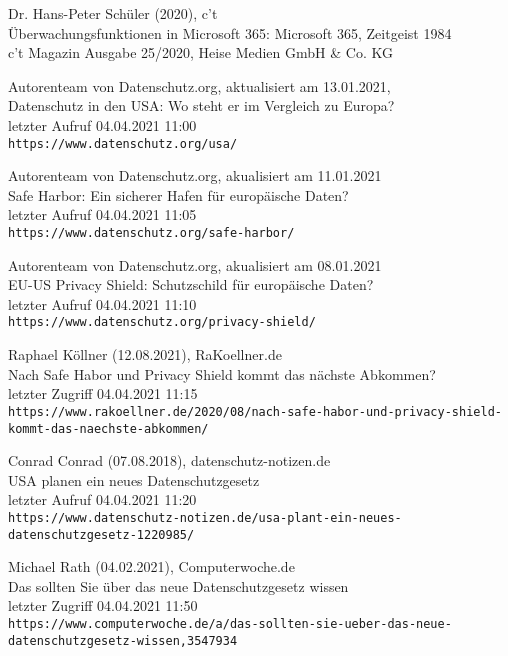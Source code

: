 \begin{thebibliography}{9}
    \bibitem{}
        Dr. Hans-Peter Schüler (2020), c't
        \\Überwachungsfunktionen in Microsoft 365: Microsoft 365, Zeitgeist 1984
        \\c't Magazin Ausgabe 25/2020, Heise Medien GmbH \& Co. KG

    \bibitem{}
        Autorenteam von Datenschutz.org, aktualisiert am 13.01.2021,
        \\Datenschutz in den USA: Wo steht er im Vergleich zu Europa?
        \\letzter Aufruf 04.04.2021 11:00
        \\\texttt{https://www.datenschutz.org/usa/}

    \bibitem{}
        Autorenteam von Datenschutz.org, akualisiert am 11.01.2021
        \\Safe Harbor: Ein sicherer Hafen für europäische Daten?
        \\letzter Aufruf 04.04.2021 11:05
        \\\texttt{https://www.datenschutz.org/safe-harbor/}

    \bibitem{}
        Autorenteam von Datenschutz.org, akualisiert am 08.01.2021
        \\EU-US Privacy Shield: Schutzschild für europäische Daten?
        \\letzter Aufruf 04.04.2021 11:10
        \\\texttt{https://www.datenschutz.org/privacy-shield/}

    \bibitem{}
        Raphael Köllner (12.08.2021), RaKoellner.de
        \\Nach Safe Habor und Privacy Shield kommt das nächste Abkommen?
        \\letzter Zugriff 04.04.2021 11:15
        \\\texttt{https://www.rakoellner.de/2020/08/nach-safe-habor-und-privacy-shield-kommt-das-naechste-abkommen/}

    \bibitem{}
        Conrad Conrad (07.08.2018), datenschutz-notizen.de
        \\USA planen ein neues Datenschutzgesetz
        \\letzter Aufruf 04.04.2021 11:20
        \\\texttt{https://www.datenschutz-notizen.de/usa-plant-ein-neues-datenschutzgesetz-1220985/}

    \bibitem{}
        Michael Rath (04.02.2021), Computerwoche.de
        \\Das sollten Sie über das neue Datenschutzgesetz wissen
        \\letzter Zugriff 04.04.2021 11:50
        \\\texttt{https://www.computerwoche.de/a/das-sollten-sie-ueber-das-neue-datenschutzgesetz-wissen,3547934}


\end{thebibliography}
